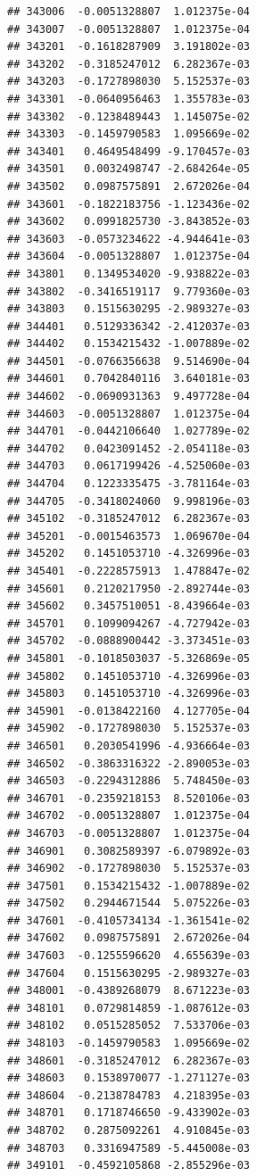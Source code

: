 \documentclass[ignorenonframetext,]{beamer}
\begin{document}
\begin{frame}[fragile]
\begin{verbatim}
## 343006  -0.0051328807  1.012375e-04
## 343007  -0.0051328807  1.012375e-04
## 343201  -0.1618287909  3.191802e-03
## 343202  -0.3185247012  6.282367e-03
## 343203  -0.1727898030  5.152537e-03
## 343301  -0.0640956463  1.355783e-03
## 343302  -0.1238489443  1.145075e-02
## 343303  -0.1459790583  1.095669e-02
## 343401   0.4649548499 -9.170457e-03
## 343501   0.0032498747 -2.684264e-05
## 343502   0.0987575891  2.672026e-04
## 343601  -0.1822183756 -1.123436e-02
## 343602   0.0991825730 -3.843852e-03
## 343603  -0.0573234622 -4.944641e-03
## 343604  -0.0051328807  1.012375e-04
## 343801   0.1349534020 -9.938822e-03
## 343802  -0.3416519117  9.779360e-03
## 343803   0.1515630295 -2.989327e-03
## 344401   0.5129336342 -2.412037e-03
## 344402   0.1534215432 -1.007889e-02
## 344501  -0.0766356638  9.514690e-04
## 344601   0.7042840116  3.640181e-03
## 344602  -0.0690931363  9.497728e-04
## 344603  -0.0051328807  1.012375e-04
## 344701  -0.0442106640  1.027789e-02
## 344702   0.0423091452 -2.054118e-03
## 344703   0.0617199426 -4.525060e-03
## 344704   0.1223335475 -3.781164e-03
## 344705  -0.3418024060  9.998196e-03
## 345102  -0.3185247012  6.282367e-03
## 345201  -0.0015463573  1.069670e-04
## 345202   0.1451053710 -4.326996e-03
## 345401  -0.2228575913  1.478847e-02
## 345601   0.2120217950 -2.892744e-03
## 345602   0.3457510051 -8.439664e-03
## 345701   0.1099094267 -4.727942e-03
## 345702  -0.0888900442 -3.373451e-03
## 345801  -0.1018503037 -5.326869e-05
## 345802   0.1451053710 -4.326996e-03
## 345803   0.1451053710 -4.326996e-03
## 345901  -0.0138422160  4.127705e-04
## 345902  -0.1727898030  5.152537e-03
## 346501   0.2030541996 -4.936664e-03
## 346502  -0.3863316322 -2.890053e-03
## 346503  -0.2294312886  5.748450e-03
## 346701  -0.2359218153  8.520106e-03
## 346702  -0.0051328807  1.012375e-04
## 346703  -0.0051328807  1.012375e-04
## 346901   0.3082589397 -6.079892e-03
## 346902  -0.1727898030  5.152537e-03
## 347501   0.1534215432 -1.007889e-02
## 347502   0.2944671544  5.075226e-03
## 347601  -0.4105734134 -1.361541e-02
## 347602   0.0987575891  2.672026e-04
## 347603  -0.1255596620  4.655639e-03
## 347604   0.1515630295 -2.989327e-03
## 348001  -0.4389268079  8.671223e-03
## 348101   0.0729814859 -1.087612e-03
## 348102   0.0515285052  7.533706e-03
## 348103  -0.1459790583  1.095669e-02
## 348601  -0.3185247012  6.282367e-03
## 348603   0.1538970077 -1.271127e-03
## 348604  -0.2138784783  4.218395e-03
## 348701   0.1718746650 -9.433902e-03
## 348702   0.2875092261  4.910845e-03
## 348703   0.3316947589 -5.445008e-03
## 349101  -0.4592105868 -2.855296e-03

\end{verbatim}
\end{frame}
\end{document}
